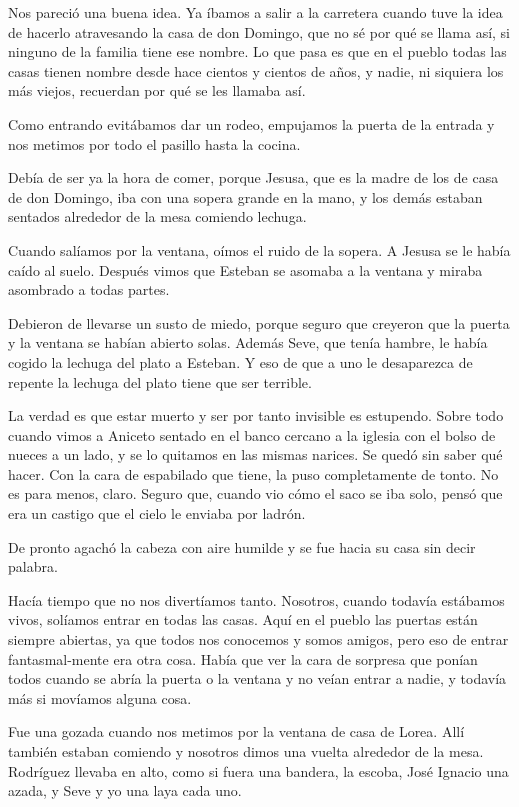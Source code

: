 \documentclass{barcodevapor3pags}
\begin{document}
Nos pareció una buena idea. Ya íbamos a salir a la carretera cuando tuve
la idea de hacerlo atravesando la casa de don Domingo, que no sé por qué
se llama así, si ninguno de la familia tiene ese nombre. Lo que pasa es
que en el pueblo todas las casas tienen nombre desde hace cientos y
cientos de años, y nadie, ni siquiera los más viejos, recuerdan por qué
se les llamaba así.~

Como entrando evitábamos dar un rodeo, empujamos la puerta de la entrada
y nos metimos por todo el pasillo hasta la cocina.~

Debía de ser ya la hora de comer, porque Jesusa, que es la madre de los
de casa de don Domingo, iba con una sopera grande en la mano, y los
demás estaban sentados alrededor de la mesa comiendo lechuga.~

Cuando salíamos por la ventana, oímos el ruido de la sopera. A Jesusa se
le había caído al suelo. Después vimos que Esteban se asomaba a la
ventana y miraba asombrado a todas partes.~

Debieron de llevarse un susto de miedo, porque seguro que creyeron que
la puerta y la ventana se habían abierto solas. Además Seve, que tenía
hambre, le había cogido la lechuga del plato a Esteban. Y eso de que a
uno le desaparezca de repente la lechuga del plato tiene que ser
terrible.~

La verdad es que estar muerto y ser por tanto invisible es estupendo.
Sobre todo cuando vimos a Aniceto sentado en el banco cercano a la
iglesia con el bolso de nueces a un lado, y se lo quitamos en las mismas
narices. Se quedó sin saber qué hacer. Con la cara de espabilado que
tiene, la puso completamente de tonto. No es para menos, claro. Seguro
que, cuando vio cómo el saco se iba solo, pensó que era un castigo que
el cielo le enviaba por ladrón.~

De pronto agachó la cabeza con aire humilde y se fue hacia su casa sin
decir palabra.~

Hacía tiempo que no nos divertíamos tanto. Nosotros, cuando todavía
estábamos vivos, solíamos entrar en todas las casas. Aquí en el pueblo
las puertas están siempre abiertas, ya que todos nos conocemos y somos
amigos, pero eso de entrar fantasmal-mente era otra cosa. Había que ver
la cara de sorpresa que ponían todos cuando se abría la puerta o la
ventana y no veían entrar a nadie, y todavía más si movíamos alguna
cosa.~

Fue una gozada cuando nos metimos por la ventana de casa de Lorea. Allí
también estaban comiendo y nosotros dimos una vuelta alrededor de la
mesa. Rodríguez llevaba en alto, como si fuera una bandera, la escoba,
José Ignacio una azada, y Seve y yo una laya cada uno.~
\end{document}
